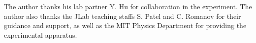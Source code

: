 \documentclass[aps,twocolumn,secnumarabic,balancelastpage,amsmath,amssymb,nofootinbib,floatfix]{revtex4-1}
\begin{document}
\begin{acknowledgments}

The author thanks his lab partner Y. Hu for collaboration in the experiment. The author also thanks the JLab teaching staffs S. Patel and C. Romanov for their guidance and support, as well as the MIT Physics Department for providing the experimental apparatus.

\end{acknowledgments}




\end{document}
